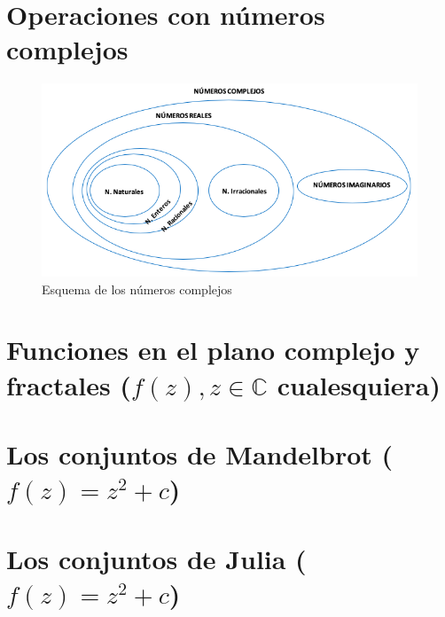 \documentclass[
  11pt,
]{krantz}
\theoremstyle{definition}
\theoremstyle{definition}
\theoremstyle{definition}
\theoremstyle{definition}
\theoremstyle{remark}
\begin{document}
\hypertarget{operaciones-con-nuxfameros-complejos}{%
\section{Operaciones con números complejos}\label{operaciones-con-nuxfameros-complejos}}

\begin{figure}

{\centering \includegraphics[width=1\linewidth,height=1\textheight]{complex} 

}

\caption{Esquema de los números complejos}\label{fig:complex}
\end{figure}

\hypertarget{funciones-en-el-plano-complejo-y-fractales-fz-zinmathbbc-cualesquiera}{%
\section{\texorpdfstring{Funciones en el plano complejo y fractales (\(f(z), z\in\mathbb{C}\) cualesquiera)}{Funciones en el plano complejo y fractales (f(z), z\textbackslash in\textbackslash mathbb\{C\} cualesquiera)}}\label{funciones-en-el-plano-complejo-y-fractales-fz-zinmathbbc-cualesquiera}}

\hypertarget{los-conjuntos-de-mandelbrot-fzz2c}{%
\section{\texorpdfstring{Los conjuntos de Mandelbrot (\(f(z)=z^2+c\))}{Los conjuntos de Mandelbrot (f(z)=z\^{}2+c)}}\label{los-conjuntos-de-mandelbrot-fzz2c}}

\hypertarget{los-conjuntos-de-julia-fzz2c}{%
\section{\texorpdfstring{Los conjuntos de Julia (\(f(z)=z^2+c\))}{Los conjuntos de Julia (f(z)=z\^{}2+c)}}\label{los-conjuntos-de-julia-fzz2c}}
\end{document}
